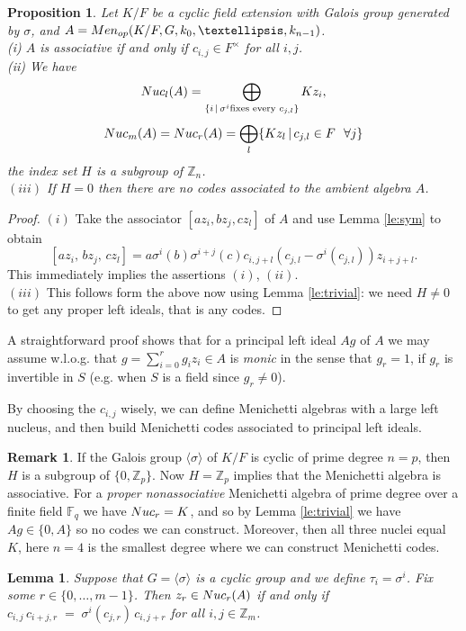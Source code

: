\documentclass[11pt]{amsart}
\theoremstyle{plain}
\newtheorem{lemma}[theorem]{Lemma}
\newtheorem{proposition}[theorem]{Proposition}
\theoremstyle{definition}
\newtheorem{remark}[theorem]{Remark}
\begin{document}
\begin{proposition}
Let $K/F$ be a cyclic field extension with Galois group generated by $\sigma$, and $A={\rm Men}_{op}(K/F,G,k_0,\dots,k_{n-1})$.
\\
(i) $A$ is associative if and only if $c_{i,j}\in F^\times$ for all $i,j$.
\\ (ii)  We have
$${\rm Nuc}_l(A)=\bigoplus_{\{i\,|\,\sigma^{i} \text{fixes every } c_{j,l}\}}Kz_i,$$
$${\rm Nuc}_m(A)={\rm Nuc}_r(A)=\bigoplus_{l}\{Kz_l\,|\, c_{j,l}\in F\ \ \forall j\}$$
 the  index set $H$ is a subgroup of $\mathbb Z_n$.
\\ $(iii)$ If $H=0$ then there are no codes associated to the ambient algebra $A$.
\end{proposition}

\begin{proof}
$(i)$ Take the associator $[az_i,bz_j,cz_l]$ of $A$ and use Lemma \ref{le:sym} to obtain
$$[az_i,\,bz_j,\,cz_l]  =a\sigma^{i}(b)\sigma^{i+j}(c) c_{i,j+l} (c_{j,l}-\sigma^{i}(c_{j,l}))z_{i+j+l}.$$
This immediately implies the assertions $(i)$, $(ii)$.
\\ $(iii)$ This follows form the above now using Lemma \ref{le:trivial}: we need $H\neq 0$ to get any proper left ideals, that is any codes.
\end{proof}

A straightforward proof shows that for a  principal left ideal $Ag$ of $A$ we may assume w.l.o.g. that $g=\sum_{i=0}^{r}g_iz_i\in A$ is \emph{monic} in the sense that $g_{r}=1$, if $g_r$ is invertible in $S$ (e.g. when $S$ is a field since $g_r\not=0$).

By choosing the $c_{i,j}$ wisely, we can define Menichetti algebras with a large left nucleus, and then  build Menichetti codes associated to principal left ideals.

\begin{remark}
If the Galois group $\langle\sigma\rangle$ of $K/F$ is cyclic of prime degree  $n=p$, then
$H$ is a subgroup of $\{0,\mathbb Z_p\}$. Now $H=\mathbb Z_p$ implies that the Menichetti algebra is associative. For a \emph{proper nonassociative}
Menichetti algebra of prime degree over a finite field $\mathbb F_q$ we have $\rm Nuc_r=K$, and so by Lemma \ref{le:trivial} we have
$Ag\in\{0,A\}$ so no codes we can construct. Moreover, then all three nuclei equal $K$, here $n=4$ is the smallest degree where we can construct Menichetti codes.
\end{remark}

\begin{lemma} Suppose that $G=\langle \sigma\rangle$ is a cyclic group and we define $\tau_i=\sigma^i$.
Fix some  $r\in \{0,\dots,m-1\}$. Then $z_r\in {\rm Nuc}_r(A)$ if and only if $c_{i,j}\,c_{i+j,r} \;=\; \sigma^{i}(c_{j,r})\,c_{i,j+r}$ for all $i,j\in \mathbb{Z}_m$.
\end{lemma}
\end{document}
